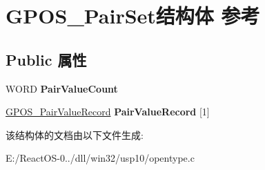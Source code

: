 \hypertarget{struct_g_p_o_s___pair_set}{}\section{G\+P\+O\+S\+\_\+\+Pair\+Set结构体 参考}
\label{struct_g_p_o_s___pair_set}
\subsection*{Public 属性}
\begin{DoxyCompactItemize}
\item 
\mbox{\label{struct_g_p_o_s___pair_set_a0bd8a18d0b9f523e6278222c9cfae062}} 
W\+O\+RD {\bfseries Pair\+Value\+Count}
\item 
\mbox{\label{struct_g_p_o_s___pair_set_ae2a72078eaa0feead480c788830350b8}} 
\hyperlink{struct_g_p_o_s___pair_value_record}{G\+P\+O\+S\+\_\+\+Pair\+Value\+Record} {\bfseries Pair\+Value\+Record} \mbox{[}1\mbox{]}
\end{DoxyCompactItemize}


该结构体的文档由以下文件生成\+:\begin{DoxyCompactItemize}
\item 
E\+:/\+React\+O\+S-\/0../dll/win32/usp10/opentype.\+c\end{DoxyCompactItemize}
